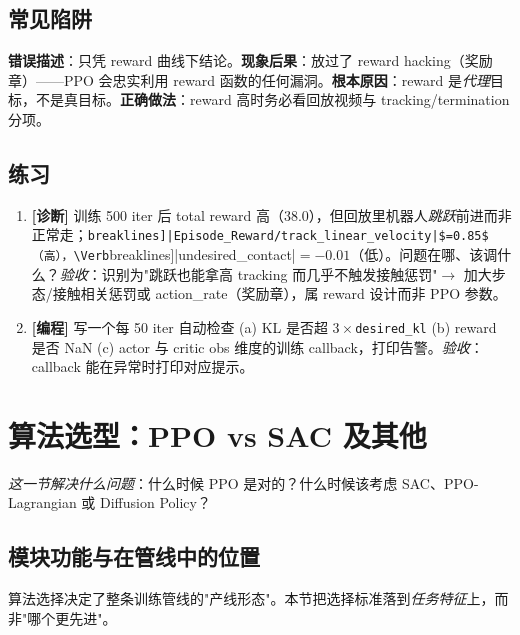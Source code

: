 \subsection{常见陷阱}

\begin{pitfall}
\textbf{错误描述}：只凭 reward 曲线下结论。\textbf{现象后果}：放过了 reward hacking（奖励章）——PPO 会忠实利用 reward 函数的任何漏洞。\textbf{根本原因}：reward 是\emph{代理}目标，不是真目标。\textbf{正确做法}：reward 高时务必看回放视频与 tracking/termination 分项。
\end{pitfall}

\subsection{练习}

\begin{practice}[诊断与监控]
\begin{enumerate}
  \item \textbf{[诊断]} 训练 500 iter 后 total reward 高（$38.0$），但回放里机器人\emph{跳跃}前进而非正常走；\Verb[breaklines]|Episode_Reward/track_linear_velocity|$=0.85$（高），\Verb[breaklines]|undesired_contact|$=-0.01$（低）。问题在哪、该调什么？\emph{验收}：识别为"跳跃也能拿高 tracking 而几乎不触发接触惩罚"$\to$ 加大步态/接触相关惩罚或 action\_rate（奖励章），属 reward 设计而非 PPO 参数。
  \item \textbf{[编程]} 写一个每 50 iter 自动检查 (a) KL 是否超 $3\times$\verb|desired_kl| (b) reward 是否 NaN (c) actor 与 critic obs 维度的训练 callback，打印告警。\emph{验收}：callback 能在异常时打印对应提示。
\end{enumerate}
\end{practice}

\section{算法选型：PPO vs SAC 及其他}
\label{sec:rlmc-train-ppo-sac}

\emph{这一节解决什么问题}：什么时候 PPO 是对的？什么时候该考虑 SAC、PPO-Lagrangian 或 Diffusion Policy？

\subsection{模块功能与在管线中的位置}

算法选择决定了整条训练管线的"产线形态"。本节把选择标准落到\emph{任务特征}上，而非"哪个更先进"。


